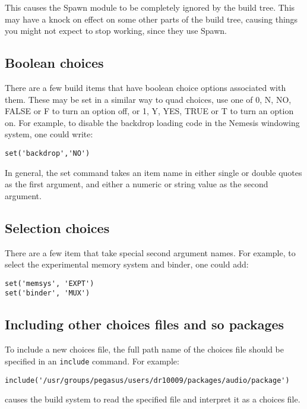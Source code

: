\documentclass[a4paper]{article}
\begin{document}
This causes the Spawn module to be completely ignored by the build
tree. This may have a knock on effect on some other parts of the build
tree, causing things you might not expect to stop working, since they use
Spawn.

\subsection{Boolean choices}

There are a few build items that have boolean choice options
associated with them. These may be set in a similar way to quad
choices, use one of 0, N, NO, FALSE or F to turn an option off, or 1,
Y, YES, TRUE or T to turn an option on. For example, to disable the
backdrop loading code in the Nemesis windowing system, one could
write:

\begin{verbatim}
set('backdrop','NO')
\end{verbatim}

In general, the set command takes an item name in either single or
double quotes as the first argument, and either a numeric or string
value as the second argument.

\subsection{Selection choices}

There are a few item that take special second argument names. For
example, to select the experimental memory system and binder, one
could add:

\begin{verbatim}
set('memsys', 'EXPT')
set('binder', 'MUX')
\end{verbatim}

\subsection{Including other choices files and so packages}

To include a new choices file, the full path name of the choices file
should be specified in an \texttt{include} command. For example:

\begin{verbatim}
include('/usr/groups/pegasus/users/dr10009/packages/audio/package')
\end{verbatim}

\noindent causes the build system to read the specified file and
interpret it as a choices file. 
\end{document}
